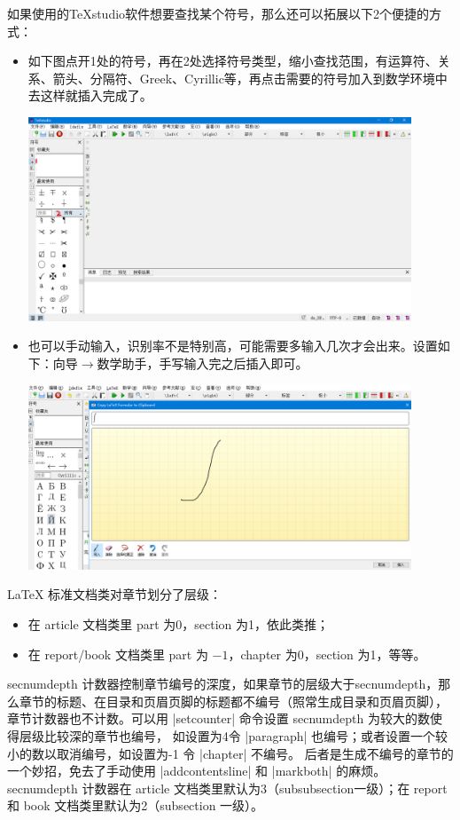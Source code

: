 如果使用的TeXstudio软件想要查找某个符号，那么还可以拓展以下2个便捷的方式：
\begin{itemize}
  \item 如下图点开1处的符号，再在2处选择符号类型，缩小查找范围，有运算符、关系、箭头、分隔符、Greek、Cyrillic等，再点击需要的符号加入到数学环境中去这样就插入完成了。

  \includegraphics[width=0.9\textwidth]{include/images/5.png}
  \item 也可以手动输入，识别率不是特别高，可能需要多输入几次才会出来。设置如下：向导$\rightarrow$数学助手，手写输入完之后插入即可。

  \includegraphics[width=0.9\textwidth]{include/images/image.png}
\end{itemize}





\LaTeX{} 标准文档类对章节划分了层级：
\begin{itemize}
  \item 在 article 文档类里 part 为0，section 为1，依此类推；
  \item 在 report/book 文档类里 part 为 $-1$，chapter 为0，section 为1，等等。
\end{itemize}

secnumdepth 计数器控制章节编号的深度，如果章节的层级大于secnumdepth，那么章节的标题、在目录和页眉页脚的标题都不编号（照常生成目录和页眉页脚），
章节计数器也不计数。可以用 |setcounter| 命令设置 secnumdepth 为较大的数使得层级比较深的章节也编号，
如设置为4令 |paragraph| 也编号；或者设置一个较小的数以取消编号，如设置为-1 令 |chapter| 不编号。
后者是生成不编号的章节的一个妙招，免去了手动使用 |addcontentsline| 和 |markboth| 的麻烦。
secnumdepth 计数器在 article 文档类里默认为3（subsubsection一级）；在 report 和 book 文档类里默认为2（subsection 一级）。

